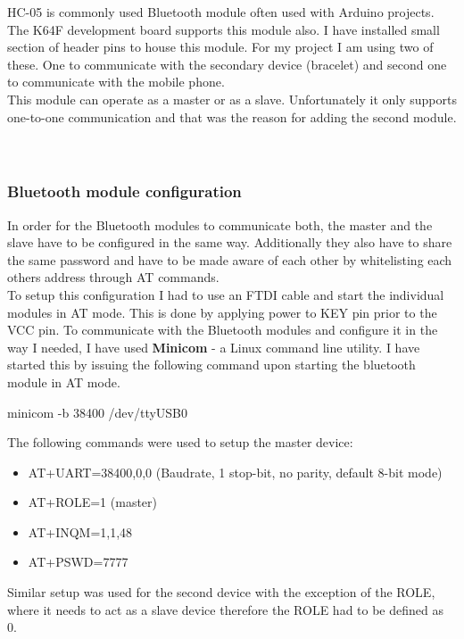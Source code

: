 \documentclass[12pt,a4paper]{article}
\begin{document}
		HC-05 is commonly used Bluetooth module often used with Arduino projects. The K64F development board supports  
		this module also. I have installed small section of header pins to house this module. For my  
		project I am using two of these. One to communicate with the secondary device (bracelet) and  
		second one to communicate with the mobile phone.\\
		
		This module can operate as a master or as a slave. Unfortunately it only supports one-to-one  
		communication and that was the reason for adding the second module.\\\\\\
		
		\subsubsection{Bluetooth module configuration}
		In order for the Bluetooth modules to communicate both, the master and the slave have to be configured in the same way. Additionally they also have to share the same password and have to be made aware of each other by whitelisting each others address through AT commands.\\ 
		
		To setup this configuration I had to use an FTDI cable and start the individual modules in AT mode. This is done by applying power to KEY pin prior to the VCC pin. To communicate with the Bluetooth modules and configure it in the way I needed, I have used {\bfseries Minicom}  - a Linux command line utility. I have started this by issuing the following command upon starting the bluetooth module in AT mode.
		\begin{center}
		 minicom -b 38400 /dev/ttyUSB0
		\end{center}
		The following commands were used to setup the master device:
		\begin{itemize}
		 \item AT+UART=38400,0,0 (Baudrate, 1 stop-bit, no parity, default 8-bit mode)
		 \item AT+ROLE=1 (master)
		 \item AT+INQM=1,1,48
		 \item AT+PSWD=7777
		\end{itemize}
		Similar setup was used for the second device with the exception of the ROLE, where it needs to act as a slave device therefore the ROLE had to be defined as 0.
		\newpage
		
\end{document}
